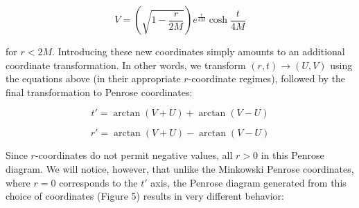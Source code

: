\documentclass{article}
\begin{document}
\begin{equation}
    V = \left(\sqrt{1 - \frac{r}{2M}}\right)e^{\frac{r}{4M}}\cosh{\frac{t}{4M}}
\end{equation}

for $r < 2M$. Introducing these new coordinates simply amounts to an additional coordinate transformation. In other words, we transform $(r,t) \rightarrow (U,V)$ using the equations above (in their appropriate $r$-coordinate regimes), followed by the final transformation to Penrose coordinates:

\begin{equation}
    t' = \arctan(V+U) + \arctan(V-U) 
\end{equation}

\begin{equation}
    r' = \arctan(V+U) - \arctan(V-U) 
\end{equation}

Since $r$-coordinates do not permit negative values, all $r>0$ in this Penrose diagram. We will notice, however, that unlike the Minkowski Penrose coordinates, where $r=0$ corresponds to the $t'$ axis, the Penrose diagram generated from this choice of coordinates (Figure 5) results in very different behavior:
\end{document}
